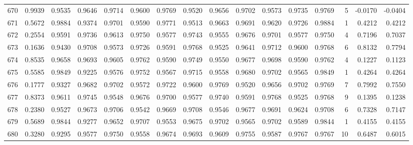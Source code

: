 \begin{tabular}{lrrrrrrrrrrrrrrr}
670 &      0.9939 &  0.9535 &  0.9646 &  0.9714 &  0.9600 &  0.9769 &  0.9520 &  0.9656 &  0.9702 &  0.9573 &   0.9735 &     0.9769 &      5 &                   -0.0170 &                    -0.0404 \\
671 &      0.5672 &  0.9884 &  0.9374 &  0.9701 &  0.9590 &  0.9771 &  0.9513 &  0.9663 &  0.9691 &  0.9620 &   0.9726 &     0.9884 &      1 &                    0.4212 &                     0.4212 \\
672 &      0.2554 &  0.9591 &  0.9736 &  0.9613 &  0.9750 &  0.9577 &  0.9743 &  0.9555 &  0.9676 &  0.9701 &   0.9577 &     0.9750 &      4 &                    0.7196 &                     0.7037 \\
673 &      0.1636 &  0.9430 &  0.9708 &  0.9573 &  0.9726 &  0.9591 &  0.9768 &  0.9525 &  0.9641 &  0.9712 &   0.9600 &     0.9768 &      6 &                    0.8132 &                     0.7794 \\
674 &      0.8535 &  0.9658 &  0.9693 &  0.9605 &  0.9762 &  0.9590 &  0.9749 &  0.9550 &  0.9677 &  0.9698 &   0.9590 &     0.9762 &      4 &                    0.1227 &                     0.1123 \\
675 &      0.5585 &  0.9849 &  0.9225 &  0.9576 &  0.9752 &  0.9567 &  0.9715 &  0.9558 &  0.9680 &  0.9702 &   0.9565 &     0.9849 &      1 &                    0.4264 &                     0.4264 \\
676 &      0.1777 &  0.9327 &  0.9682 &  0.9702 &  0.9572 &  0.9722 &  0.9600 &  0.9769 &  0.9520 &  0.9656 &   0.9702 &     0.9769 &      7 &                    0.7992 &                     0.7550 \\
677 &      0.8373 &  0.9611 &  0.9745 &  0.9548 &  0.9676 &  0.9700 &  0.9577 &  0.9740 &  0.9591 &  0.9768 &   0.9525 &     0.9768 &      9 &                    0.1395 &                     0.1238 \\
678 &      0.2380 &  0.9527 &  0.9673 &  0.9706 &  0.9542 &  0.9669 &  0.9708 &  0.9546 &  0.9677 &  0.9691 &   0.9624 &     0.9708 &      6 &                    0.7328 &                     0.7147 \\
679 &      0.5689 &  0.9844 &  0.9277 &  0.9652 &  0.9707 &  0.9553 &  0.9675 &  0.9702 &  0.9565 &  0.9702 &   0.9589 &     0.9844 &      1 &                    0.4155 &                     0.4155 \\
680 &      0.3280 &  0.9295 &  0.9577 &  0.9750 &  0.9558 &  0.9674 &  0.9693 &  0.9609 &  0.9755 &  0.9587 &   0.9767 &     0.9767 &     10 &                    0.6487 &                     0.6015 \\

\end{tabular}

